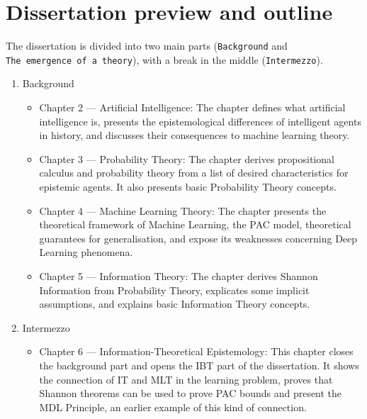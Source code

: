 \documentclass[
  letterpaper,
  12pt,
  british]{tufte-book}
\providecommand{\tightlist}{%
  \setlength{\itemsep}{0pt}\setlength{\parskip}{0pt}}\usepackage{longtable,booktabs,array}
\theoremstyle{plain}
\theoremstyle{plain}
\theoremstyle{definition}
\theoremstyle{remark}
\begin{document}
\hypertarget{dissertation-preview-and-outline}{%
\section{Dissertation preview and
outline}\label{dissertation-preview-and-outline}}

The dissertation is divided into two main parts (\texttt{Background} and
\texttt{The\ emergence\ of\ a\ theory}), with a break in the middle
(\texttt{Intermezzo}).

\begin{enumerate}
\def\labelenumi{\arabic{enumi}.}
\item
  Background

  \begin{itemize}
  \item
    Chapter 2 --- Artificial Intelligence: The chapter defines what
    artificial intelligence is, presents the epistemological differences
    of intelligent agents in history, and discusses their consequences
    to machine learning theory.
  \item
    Chapter 3 --- Probability Theory: The chapter derives propositional
    calculus and probability theory from a list of desired
    characteristics for epistemic agents. It also presents basic
    Probability Theory concepts.
  \item
    Chapter 4 --- Machine Learning Theory: The chapter presents the
    theoretical framework of Machine Learning, the PAC model,
    theoretical guarantees for generalisation, and expose its weaknesses
    concerning Deep Learning phenomena.
  \item
    Chapter 5 --- Information Theory: The chapter derives Shannon
    Information from Probability Theory, explicates some implicit
    assumptions, and explains basic Information Theory concepts.
  \end{itemize}
\item
  Intermezzo

  \begin{itemize}
  \tightlist
  \item
    Chapter 6 --- Information-Theoretical Epistemology: This chapter
    closes the background part and opens the IBT part of the
    dissertation. It shows the connection of {IT} and {MLT} in the
    learning problem, proves that Shannon theorems can be used to prove
    PAC bounds and present the {MDL} Principle, an earlier example of
    this kind of connection.
  \end{itemize}
\end{enumerate}
\end{document}
